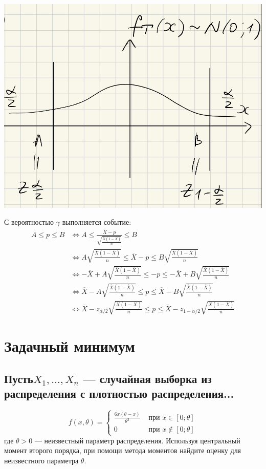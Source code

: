 \documentclass{article}
\begin{document}
\begin{center}
    \includegraphics[width=0.5\linewidth]{confidence_interval3.png}
\end{center}
С вероятностью $\gamma$ выполняется событие:
\begin{equation*}
    \begin{aligned}
        A\leqslant p\leqslant B&\Longleftrightarrow A\leqslant \frac{\overline{X}-p}{\sqrt{\frac{\overline{X}(1-\overline{X})}{n}}}\leqslant B\\
        &\Longleftrightarrow A\sqrt{\frac{\overline{X}(1-\overline{X})}{n}}\leqslant \overline{X}-p\leqslant B\sqrt{\frac{\overline{X}(1-\overline{X})}{n}}\\
        &\Longleftrightarrow-\overline{X}+A\sqrt{\frac{\overline{X}(1-\overline{X})}{n}}\leqslant-p\leqslant-\overline{X}+B\sqrt{\frac{\overline{X}(1-\overline{X})}{n}}\\
        &\Longleftrightarrow\overline{X}-A\sqrt{\frac{\overline{X}(1-\overline{X})}{n}}\leqslant p\leqslant\overline{X}-B\sqrt{\frac{\overline{X}(1-\overline{X})}{n}}\\
        &\Longleftrightarrow\overline{X}-z_{\alpha/2}\sqrt{\frac{\overline{X}(1-\overline{X})}{n}}\leqslant p\leqslant\overline{X}-z_{1-\alpha/2}\sqrt{\frac{\overline{X}(1-\overline{X})}{n}}
    \end{aligned}
\end{equation*}

\newpage
\section{Задачный минимум}
\subsection{Пусть$ X_1, \ldots, X_n$ — случайная выборка из распределения с плотностью распределения...}
\begin{equation*}
    f(x, \theta)= \begin{cases}\frac{6 x(\theta-x)}{\theta^{3}} & \text { при } x \in[0 ; \theta] \\ 0 & \text { при } x \notin[0 ; \theta]\end{cases}
\end{equation*}
где $\theta>0$ — неизвестный параметр распределения. Используя центральный момент второго порядка, при помощи метода моментов найдите оценку для неизвестного параметра $\theta$.
\end{document}
